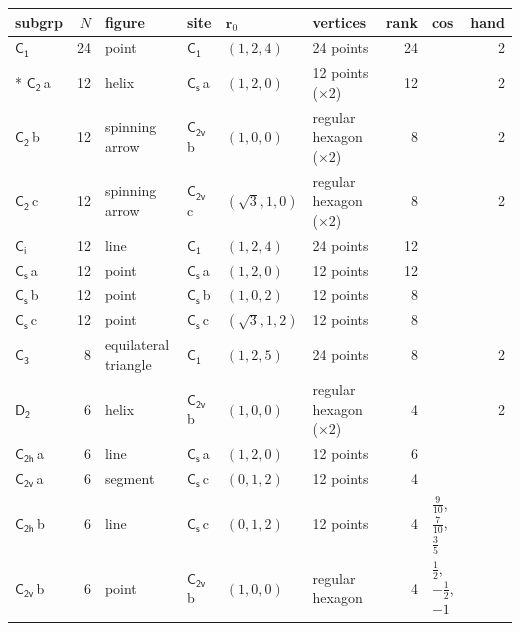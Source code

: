 \documentclass[10pt,a4paper]{article}
\numberwithin{equation}{section}
\newcommand{\grp}[1]{\mathsf{#1}}
\newcommand{\clsletter}[1]{\,{\scriptsize\color{black!55}#1}}
\newcommand{\pointr}{\mathbf{r}}
\newlength{\fillwidth}\newlength{\cellwidth}\newlength{\colwidth}
\begin{document}
{{\begin{longtable}{@{}lrllllr>{\RaggedRight\arraybackslash}p{\fillwidth}r@{}}
subgrp & $N$ & figure & site & $\pointr_0$ & vertices & rank & cos & hand\\\midrule\endhead
\bottomrule\endfoot\endlastfoot
\href{C1.pdf}{$\grp{C_{1}}$} & 24 & point & \href{C1.pdf}{$\grp{C_{1}}$} & $(1, 2, 4)$ & 24 points & 24 &  & 2\\*
\href{C2.pdf}{$\grp{C_{2}}$}\clsletter{a} & 12 & helix & \href{C1v.pdf}{$\grp{C_{s}}$}\clsletter{a} & $(1, 2, 0)$ & 12 points (${\times}2$) & 12 &  & 2\\
\href{C2.pdf}{$\grp{C_{2}}$}\clsletter{b} & 12 & spinning arrow & \href{C2v.pdf}{$\grp{C_{2v}}$}\clsletter{b} & $(1, 0, 0)$ & regular hexagon (${\times}2$) & 8 &  & 2\\
\href{C2.pdf}{$\grp{C_{2}}$}\clsletter{c} & 12 & spinning arrow & \href{C2v.pdf}{$\grp{C_{2v}}$}\clsletter{c} & $(\sqrt{3}, 1, 0)$ & regular hexagon (${\times}2$) & 8 &  & 2\\
\href{S2.pdf}{$\grp{C_{i}}$} & 12 & line & \href{C1.pdf}{$\grp{C_{1}}$} & $(1, 2, 4)$ & 24 points & 12 &  & \\
\href{C1v.pdf}{$\grp{C_{s}}$}\clsletter{a} & 12 & point & \href{C1v.pdf}{$\grp{C_{s}}$}\clsletter{a} & $(1, 2, 0)$ & 12 points & 12 &  & \\
\href{C1v.pdf}{$\grp{C_{s}}$}\clsletter{b} & 12 & point & \href{C1v.pdf}{$\grp{C_{s}}$}\clsletter{b} & $(1, 0, 2)$ & 12 points & 8 &  & \\
\href{C1v.pdf}{$\grp{C_{s}}$}\clsletter{c} & 12 & point & \href{C1v.pdf}{$\grp{C_{s}}$}\clsletter{c} & $(\sqrt{3}, 1, 2)$ & 12 points & 8 &  & \\
\href{C3.pdf}{$\grp{C_{3}}$} & 8 & equilateral triangle & \href{C1.pdf}{$\grp{C_{1}}$} & $(1, 2, 5)$ & 24 points & 8 &  & 2\\
\href{D2.pdf}{$\grp{D_{2}}$} & 6 & helix & \href{C2v.pdf}{$\grp{C_{2v}}$}\clsletter{b} & $(1, 0, 0)$ & regular hexagon (${\times}2$) & 4 &  & 2\\
\href{C2h.pdf}{$\grp{C_{2h}}$}\clsletter{a} & 6 & line & \href{C1v.pdf}{$\grp{C_{s}}$}\clsletter{a} & $(1, 2, 0)$ & 12 points & 6 &  & \\
\href{C2v.pdf}{$\grp{C_{2v}}$}\clsletter{a} & 6 & segment & \href{C1v.pdf}{$\grp{C_{s}}$}\clsletter{c} & $(0, 1, 2)$ & 12 points & 4 &  & \\
\href{C2h.pdf}{$\grp{C_{2h}}$}\clsletter{b} & 6 & line & \href{C1v.pdf}{$\grp{C_{s}}$}\clsletter{c} & $(0, 1, 2)$ & 12 points & 4 & ${\tfrac{9}{10}}$, ${\tfrac{7}{10}}$, ${\tfrac{3}{5}}$ & \\
\href{C2v.pdf}{$\grp{C_{2v}}$}\clsletter{b} & 6 & point & \href{C2v.pdf}{$\grp{C_{2v}}$}\clsletter{b} & $(1, 0, 0)$ & regular hexagon & 4 & ${\tfrac{1}{2}}$, ${-\tfrac{1}{2}}$, ${-1}$ & \\

\end{longtable}}}
\end{document}
